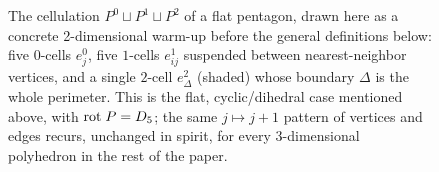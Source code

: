 \documentclass{amsart}
\theoremstyle{plain}
\theoremstyle{definition}
\begin{document}
\begin{figure}[h]
    \centering
    \caption{The cellulation $P^0\sqcup P^1\sqcup P^2$ of a flat pentagon, drawn here as a concrete 2-dimensional warm-up before the general definitions below: five $0$-cells $e^0_j$, five $1$-cells $e^1_{ij}$ suspended between nearest-neighbor vertices, and a single $2$-cell $e^2_\Delta$ (shaded) whose boundary $\Delta$ is the whole perimeter. This is the flat, cyclic/dihedral case mentioned above, with $\mathrm{rot}\hspace{1mm}P=D_5$; the same $j\mapsto j+1$ pattern of vertices and edges recurs, unchanged in spirit, for every 3-dimensional polyhedron in the rest of the paper.}
    \label{fig:cell-pentagon}
\end{figure}
\end{document}
